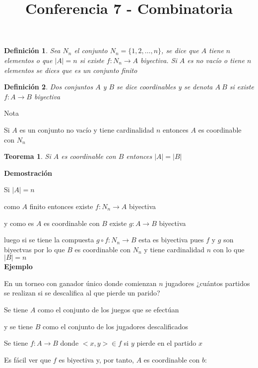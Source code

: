 \documentclass[a4paper,12pt]{report}
\title{Conferencia 7 - Combinatoria}
\author{}
\newtheorem*{teo}{Teorema}
\newtheorem*{dfn}{Definición}
\begin{document}
\maketitle




\begin{dfn}
  Sea $N_n$ el conjunto $N_n=\{1,2,\dots,n\}$, se dice que $A$ tiene $n$ elementos o que $|A|=n$ si existe $f:N_n\rightarrow A$ biyectiva. Si $A$ es no vacío o tiene $n$ elementos se dices que es un conjunto finito
\end{dfn}

\begin{dfn}
 Dos conjuntos $A$ y $B$ se dice coordinables y se denota $A~B$ si existe $f:A\rightarrow B$ biyectiva
\end{dfn}

Nota

Si $A$ es  un conjunto no vacío y tiene cardinalidad $n$ entonces  $A$ es coordinable con $N_n$

\begin{teo}
 Si $A$ es coordinable con $B$ entonces $|A|=|B|$
\end{teo}


\textbf{Demostración}

Si $|A|=n$ 

como $A$ finito entonces existe $f:N_n\rightarrow A$ biyectiva

y como es $A$ es coordinable con $B$ existe $g:A\rightarrow B$ biyectiva

luego si se tiene la compuesta $g\circ f: N_n\rightarrow B$ esta es biyectiva pues $f$ y $g$  son biyectvas por lo que $B$ es coordinable con $N_n$ y tiene cardinalidad $n$ con lo que $|B|=n$\\

\textbf{Ejemplo}
 
 En un torneo con ganador único donde comienzan $n$ jugadores ¿cuántos partidos se realizan si se descalifica al que pierde un parido?
 
 Se tiene $A$ como el conjunto de los juegos que se efectúan
 
 y se tiene $B$ como el conjunto de los jugadores descalificados
 
 Se tiene  $f:A\rightarrow B$ donde $<x,y>\in f$ si $y$ pierde en el partido $x$
 
 Es fácil ver que $f$ es biyectiva y, por tanto, $A$ es coordinable con $b$:
 
\end{document}
